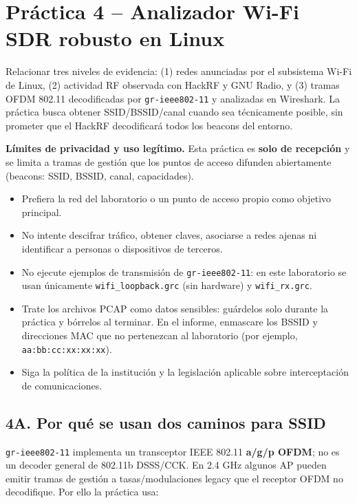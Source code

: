 \section{Práctica 4 -- Analizador Wi-Fi SDR robusto en Linux}

\begin{objetivo}
Relacionar tres niveles de evidencia: (1) redes anunciadas por el subsistema Wi-Fi de Linux, (2) actividad RF observada con HackRF y GNU Radio, y (3) tramas OFDM 802.11 decodificadas por \texttt{gr-ieee802-11} y analizadas en Wireshark. La práctica busca obtener SSID/BSSID/canal cuando sea técnicamente posible, sin prometer que el HackRF decodificará todos los beacons del entorno.
\end{objetivo}

\begin{alerta}
\textbf{Límites de privacidad y uso legítimo.} Esta práctica es \textbf{solo de recepción} y se limita a tramas de gestión que los puntos de acceso difunden abiertamente (beacons: SSID, BSSID, canal, capacidades).
\begin{itemize}
    \item Prefiera la red del laboratorio o un punto de acceso propio como objetivo principal.
    \item No intente descifrar tráfico, obtener claves, asociarse a redes ajenas ni identificar a personas o dispositivos de terceros.
    \item No ejecute ejemplos de transmisión de \texttt{gr-ieee802-11}: en este laboratorio se usan únicamente \texttt{wifi\_loopback.grc} (sin hardware) y \texttt{wifi\_rx.grc}.
    \item Trate los archivos PCAP como datos sensibles: guárdelos solo durante la práctica y bórrelos al terminar. En el informe, enmascare los BSSID y direcciones MAC que no pertenezcan al laboratorio (por ejemplo, \texttt{aa:bb:cc:xx:xx:xx}).
    \item Siga la política de la institución y la legislación aplicable sobre interceptación de comunicaciones.
\end{itemize}
\end{alerta}

\subsection{4A. Por qué se usan dos caminos para SSID}

\texttt{gr-ieee802-11} implementa un transceptor IEEE 802.11 \textbf{a/g/p OFDM}; no es un decoder general de 802.11b DSSS/CCK. En 2.4 GHz algunos AP pueden emitir tramas de gestión a tasas/modulaciones legacy que el receptor OFDM no decodifique. Por ello la práctica usa:

